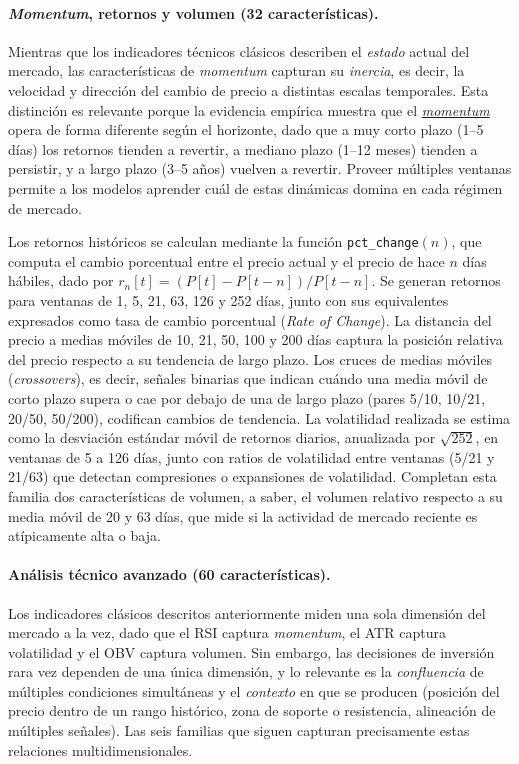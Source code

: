\paragraph{\textit{Momentum}, retornos y volumen (32 caracter\'isticas).}
Mientras que los indicadores t\'ecnicos cl\'asicos describen el \textit{estado} actual del mercado, las caracter\'isticas de \textit{momentum} capturan su \textit{inercia}, es decir, la velocidad y direcci\'on del cambio de precio a distintas escalas temporales. Esta distinci\'on es relevante porque la evidencia emp\'irica muestra que el \hyperlink{glos:momentum}{\textit{momentum}} opera de forma diferente seg\'un el horizonte, dado que a muy corto plazo (1--5 d\'ias) los retornos tienden a revertir, a mediano plazo (1--12 meses) tienden a persistir, y a largo plazo (3--5 a\~nos) vuelven a revertir. Proveer m\'ultiples ventanas permite a los modelos aprender cu\'al de estas din\'amicas domina en cada r\'egimen de mercado.

Los retornos hist\'oricos se calculan mediante la funci\'on \texttt{pct\_change}$(n)$, que computa el cambio porcentual entre el precio actual y el precio de hace $n$ d\'ias h\'abiles, dado por $r_n[t] = (P[t] - P[t-n]) / P[t-n]$. Se generan retornos para ventanas de 1, 5, 21, 63, 126 y 252 d\'ias, junto con sus equivalentes expresados como tasa de cambio porcentual (\textit{Rate of Change}). La distancia del precio a medias m\'oviles de 10, 21, 50, 100 y 200 d\'ias captura la posici\'on relativa del precio respecto a su tendencia de largo plazo. Los cruces de medias m\'oviles (\textit{crossovers}), es decir, se\~nales binarias que indican cu\'ando una media m\'ovil de corto plazo supera o cae por debajo de una de largo plazo (pares 5/10, 10/21, 20/50, 50/200), codifican cambios de tendencia. La volatilidad realizada se estima como la desviaci\'on est\'andar m\'ovil de retornos diarios, anualizada por $\sqrt{252}$, en ventanas de 5 a 126 d\'ias, junto con ratios de volatilidad entre ventanas (5/21 y 21/63) que detectan compresiones o expansiones de volatilidad. Completan esta familia dos caracter\'isticas de volumen, a saber, el volumen relativo respecto a su media m\'ovil de 20 y 63 d\'ias, que mide si la actividad de mercado reciente es at\'ipicamente alta o baja.

\paragraph{An\'alisis t\'ecnico avanzado (60 caracter\'isticas).}
Los indicadores cl\'asicos descritos anteriormente miden una sola dimensi\'on del mercado a la vez, dado que el RSI captura \textit{momentum}, el ATR captura volatilidad y el OBV captura volumen. Sin embargo, las decisiones de inversi\'on rara vez dependen de una \'unica dimensi\'on, y lo relevante es la \textit{confluencia} de m\'ultiples condiciones simult\'aneas y el \textit{contexto} en que se producen (posici\'on del precio dentro de un rango hist\'orico, zona de soporte o resistencia, alineaci\'on de m\'ultiples se\~nales). Las seis familias que siguen capturan precisamente estas relaciones multidimensionales.

